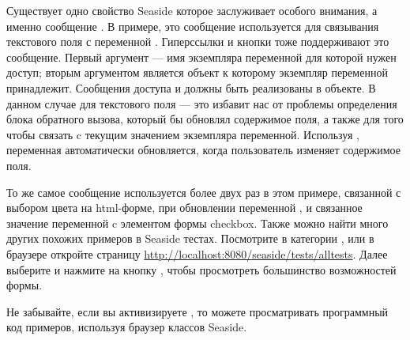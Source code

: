 \documentclass[a4paper,10pt,twoside]{book}
\begin{document}
Существует одно свойство Seaside которое заслуживает особого внимания,
а именно сообщение .
В примере,
это сообщение используется для связывания текстового
поля с переменной .
Гиперссылки и кнопки тоже поддерживают это сообщение.
Первый аргумент --- имя экземпляра переменной для которой нужен доступ;
вторым аргументом является объект
к которому экземпляр переменной принадлежит.
Сообщения доступа  и 
должны быть реализованы в объекте.
В данном случае для текстового поля ---
это избавит нас от проблемы определения блока обратного вызова,
который бы обновлял содержимое поля, а также для того
чтобы связать c текущим значением экземпляра переменной.
Используя ,
переменная  автоматически обновляется, когда пользователь изменяет содержимое поля.



То же самое сообщение используется более двух раз в этом примере,
связанной с выбором цвета на html-форме,
при обновлении переменной , и связанное значение переменной
 c элементом формы checkbox.
Также можно найти много других похожих примеров в Seaside тестах.
Посмотрите в категории ,
или в браузере откройте страницу
\url{http://localhost:8080/seaside/tests/alltests}.
Далее выберите  и нажмите на кнопку ,
чтобы просмотреть большинство возможностей формы.


Не забывайте, если вы активизируете ,
то можете просматривать программный код примеров,
используя браузер классов Seaside.

\end{document}
